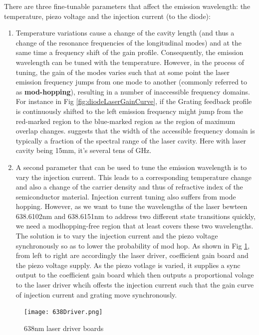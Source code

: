 \documentclass[12pt]{report}
\begin{document}
There are three fine-tunable parameters that affect the emission wavelength: the temperature, piezo voltage and the injection current (to the diode): 
\begin{enumerate}
    \item Temperature variations cause a change of the cavity length (and thus a change of the resonance frequencies of the longitudinal modes) and at the same time a frequency shift of the gain profile. Consequently, the emission wavelength can be tuned with the temperature. However, in the process of tuning, the gain of the modes varies such that at some point the laser emission frequency jumps from one mode to another (commonly referred to as \textbf{mod-hopping}), resulting in a number of inaccessible frequency domains. For instance in Fig \ref{fig:diodeLaserGainCurve}, if the Grating feedback profile is continuously shifted to the left emission frequency might jump from the red-marked region to the blue-marked region as the region of maximum overlap changes. \cite{compactGratingDiodeLaser} suggests that the width of the accessible frequency domain is typically a fraction of the spectral range of the laser cavity. Here with laser cavity being 15mm, it's several tens of GHz.

    \item A second parameter that can be used to tune the emission wavelength is to vary the injection current. This leads to a corresponding temperature change and also a change of the carrier density and thus of refractive index of the semiconductor material. Injection current tuning also suffers from mode hopping. However, as we want to tune the wavelengths of the laser bewteen 638.6102nm and 638.6151nm to address two different state transitions quickly, we need a modhopping-free region that at least covers these two wavelengths. The solution is to vary the injection current and the piezo voltage synchronously so as to lower the probability of mod hop. As shown in Fig \ref{fig:638Driver}, from left to right are accordingly the laser driver, coefficient gain board and the piezo voltage supply. As the piezo votlage is varied, it supplies a sync output to the coefficient gain board which then outputs a proportional volage to the laser driver whcih offests the injection current such that the gain curve of injection current and grating move synchronously. 
\end{enumerate}

\begin{figure}[H]
    \centering
    \texttt{[image: 638Driver.png]}
    \caption{638nm laser driver boards}
    \label{fig:638Driver}
\end{figure}
 
\end{document}
